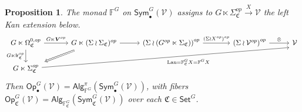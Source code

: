 \documentclass[a4paper,10pt
]{article}%
\numberwithin{equation}{section}
\numberwithin{figure}{section}
\newtheorem{proposition}[equation]{Proposition}%
\theoremstyle{definition} %
\newcommand{\Sym}{\ensuremath{\mathsf{Sym}}}%
\newcommand{\Set}{\ensuremath{\mathsf{Set}}}
\newcommand{\Op}{\mathsf{Op}}%
\newcommand{\Alg}{\mathsf{Alg}}
\DeclareMathOperator{\Lan}{Lan}%
\newcommand{\V}{\ensuremath{\mathcal V}}
\newcommand{\1}{\ensuremath{\mathbbm 1}}%
\begin{document}
\begin{proposition}\label{FGC PROP}
	The monad $\mathbb{F}^G$ on $\mathsf{Sym}^G_{\bullet}(\V)$
	assigns to 
	$G \ltimes \Sigma^{op}_{\mathfrak{C}} \xrightarrow{X} \V$
	the left Kan extension below.
	\begin{equation}\label{FGC_EQ}
                \begin{tikzcd}[column sep = 28pt]
                        G \ltimes \Omega^{0,op}_{\mathfrak{C}}
                        \arrow[d, "G \ltimes \mathsf{lr}_{\mathfrak C}^{op}"']
                        \arrow[r, "G \ltimes \boldsymbol{V}^{op}"]
                        &[6pt]
                        G \ltimes (\Sigma \wr \Sigma_{\mathfrak{C}})^{op} \arrow{r}
                        \arrow[dl, Rightarrow, shorten >=0.15cm,shorten <=0.15cm]
                        &
                        \left( \Sigma \wr \left( G^{op} \ltimes \Sigma_{\mathfrak{C}} \right) \right)^{op}
                        \arrow[r, "(\Sigma \wr X^{op})^{op}"]
                        &[10pt]
                        \left(\Sigma \wr \V^{op}\right)^{op} \arrow[r, "\otimes"]
                        &
                        \V
                        \\
                        G \ltimes \Sigma^{op}_{\mathfrak{C}}
                        \arrow[urrrr, "\Lan = \mathbb F_{\mathfrak{C}}^G X = \mathbb F^G X"', end anchor = south west]
                \end{tikzcd}
        \end{equation}
        Then $\Op_\bullet^G(\V) = \Alg^\pi_{\mathbb F^G}(\Sym_\bullet^G(\V))$,
        with fibers $\Op_{\mathfrak C}^G(\V) = \Alg_{\mathbb F_{\mathfrak C}^G}(\Sym_{\mathfrak C}^G(\V))$ over each $\mathfrak C \in \Set^G$. %
\end{proposition}
\end{document}
